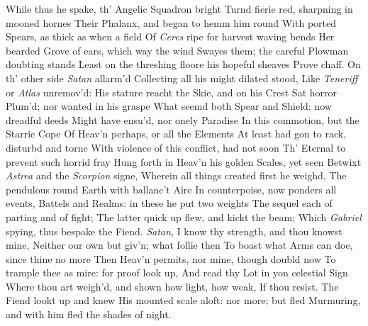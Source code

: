 \documentclass[11pt]{book}
\newcounter {first}
\begin{document}
\quad While thus he spake, th' Angelic Squadron bright 
Turnd fierie red, sharpning in mooned hornes 
Their Phalanx, and began to hemm him round 
With ported Spears, as thick as when a field 
Of \textit{Ceres} ripe for harvest waving bends 
Her bearded Grove of ears, which way the wind 
Swayes them; the careful Plowman doubting stands 
Least on the threshing floore his hopeful sheaves 
Prove chaff.  On th' other side \textit{Satan} allarm'd 
Collecting all his might dilated stood, 
Like \textit{Teneriff} or \textit{Atlas} unremov'd: 
His stature reacht the Skie, and on his Crest 
Sat horror Plum'd; nor wanted in his graspe 
What seemd both Spear and Shield: now dreadful deeds 
Might have ensu'd, nor onely Paradise 
In this commotion, but the Starrie Cope 
Of Heav'n perhaps, or all the Elements 
At least had gon to rack, disturbd and torne 
With violence of this conflict, had not soon 
Th' Eternal to prevent such horrid fray 
Hung forth in Heav'n his golden Scales, yet seen 
Betwixt \textit{Astrea} and the \textit{Scorpion} signe, 
Wherein all things created first he weighd, 
The pendulous round Earth with ballanc't Aire 
In counterpoise, now ponders all events, 
Battels and Realms: in these he put two weights 
The sequel each of parting and of fight; 
The latter quick up flew, and kickt the beam; 
Which \textit{Gabriel} spying, thus bespake the Fiend. 
\quad \textit{Satan}, I know thy strength, and thou knowst mine, 
Neither our own but giv'n; what follie then 
To boast what Arms can doe, since thine no more 
Then Heav'n permits, nor mine, though doubld now 
To trample thee as mire: for proof look up, 
And read thy Lot in yon celestial Sign 
Where thou art weigh'd, and shown how light, how weak, 
If thou resist.  The Fiend lookt up and knew 
His mounted scale aloft: nor more; but fled 
Murmuring, and with him fled the shades of night. 


\Book
 
\end{document}
